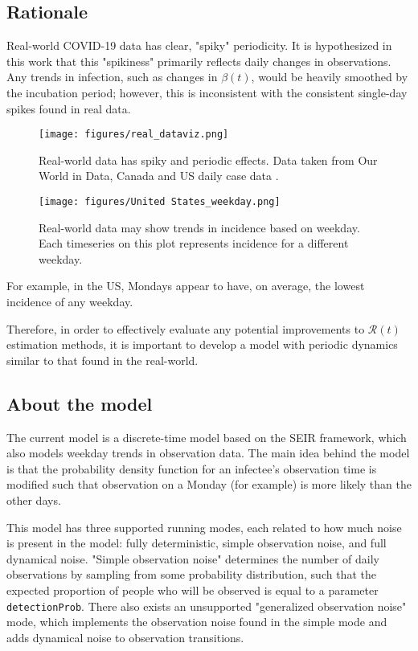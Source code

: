 \documentclass{article}
\newcommand{\nR}{\mathcal{R}}
\newcommand{\code}[1]{\texttt{#1}}
\begin{document}
\subsection{Rationale}
Real-world COVID-19 data has clear, "spiky" periodicity. It is hypothesized in this work that this "spikiness" primarily reflects daily changes in observations. Any trends in infection, such as changes in $\beta(t)$, would be heavily smoothed by the incubation period; however, this is inconsistent with the consistent single-day spikes found in real data. 

\clearpage
\begin{figure}
    \centering
    \texttt{[image: figures/real\_dataviz.png]}
    \caption{Real-world data has spiky and periodic effects. Data taken from Our World in Data, Canada and US daily case data \cite{OWID}.}
    \label{fig:my_label}
\end{figure}

\clearpage
\begin{figure}
	\centering
    \texttt{[image: figures/United States\_weekday.png]}
    \caption{Real-world data may show trends in incidence based on weekday. Each timeseries on this plot represents incidence for a different weekday. }
    \label{fig:my_label}
\end{figure}

For example, in the US, Mondays appear to have, on average, the lowest incidence of any weekday.

Therefore, in order to effectively evaluate any potential improvements to $\nR(t)$ estimation methods, it is important to develop a model with periodic dynamics similar to that found in the real-world. 

\subsection{About the model}
The current model is a discrete-time model based on the SEIR framework, which also models weekday trends in observation data. The main idea behind the model is that the probability density function for an infectee's observation time is modified such that observation on a Monday (for example) is more likely than the other days.

This model has three supported running modes, each related to how much noise is present in the model: fully deterministic, simple observation noise, and full dynamical noise. "Simple observation noise" determines the number of daily observations by sampling from some probability distribution, such that the expected proportion of people who will be observed is equal to a parameter \code{detectionProb}. There also exists an unsupported "generalized observation noise" mode, which implements the observation noise found in the simple mode and adds dynamical noise to observation transitions.
\end{document}
